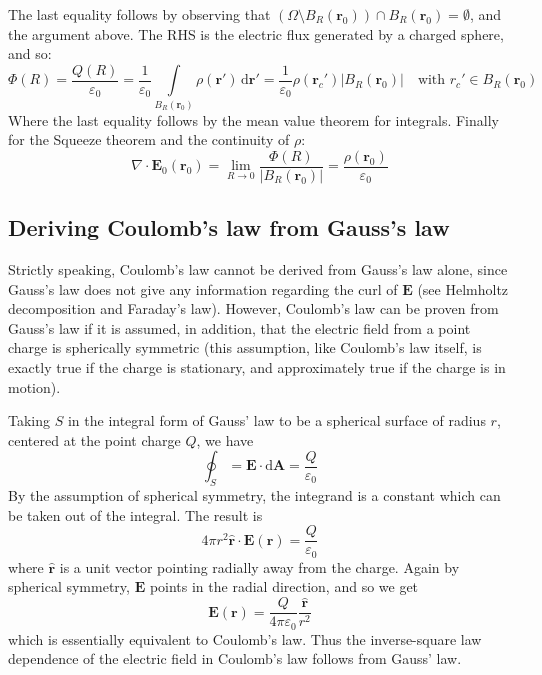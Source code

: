 \documentclass[a4paper]{article}
\begin{document}
The last equality follows by observing that \((\Omega \setminus B_R(\mathbf{r}_0)) \cap B_R(\mathbf{r}_0) = \emptyset\), and the argument above.
The RHS is the electric flux generated by a charged sphere, and so:
\[
    \Phi(R) = \frac{Q(R)}{\varepsilon_0}
    = \frac{1}{\varepsilon_0}
        \int\limits_{B_R(\mathbf{r}_0)}
            \rho(\mathbf{r}') \, \mathrm{d}\mathbf{r}'
    = \frac{1}{\varepsilon_0}
        \rho(\mathbf{r}_c') |B_R(\mathbf{r}_0)|
            \quad \text{with } r_c' \in B_R(\mathbf{r}_0)
\]
Where the last equality follows by the mean value theorem for integrals. Finally for the Squeeze theorem and the continuity of \(\rho\): 
\[
    \nabla \cdot \mathbf{E}_0(\mathbf{r}_0) =
        \lim_{R \to 0} \frac{\Phi(R)}{|B_R(\mathbf{r}_0)|}
    = \frac{\rho(\mathbf{r}_0)}{\varepsilon_0}
\]

\subsection{Deriving Coulomb's law from Gauss's law}
Strictly speaking, Coulomb's law cannot be derived from Gauss's law alone, since Gauss's law does not give any information regarding the curl of \(\mathbf{E}\) (see Helmholtz decomposition and Faraday's law). However, Coulomb's law can be proven from Gauss's law if it is assumed, in addition, that the electric field from a point charge is spherically symmetric (this assumption, like Coulomb's law itself, is exactly true if the charge is stationary, and approximately true if the charge is in motion). 

\begin{mdframed}[%
    style=mystyle,%
    frametitle={Outline of proof}]

Taking \(S\) in the integral form of Gauss' law to be a spherical surface of radius \(r\), centered at the point charge \(Q\), we have 
\[
    \oint_S = \mathbf{E} \cdot \mathrm{d}\mathbf{A} = \frac{Q}{\varepsilon_0}
\]
By the assumption of spherical symmetry, the integrand is a constant which can be taken out of the integral. The result is 
\[
    4 \pi r^2 \hat{\mathbf{r}} \cdot \mathbf{E}(\mathbf{r}) = \frac{Q}{\varepsilon_0}
\]
where \(\hat{\mathbf{r}}\) is a unit vector pointing radially away from the charge. Again by spherical symmetry, \(\mathbf{E}\) points in the radial direction, and so we get 
\[
    \mathbf{E}(\mathbf{r}) = \frac{Q}{4 \pi \varepsilon_0} \frac{\hat{\mathbf{r}}}{r^2}
\]
which is essentially equivalent to Coulomb's law. Thus the inverse-square law dependence of the electric field in Coulomb's law follows from Gauss' law. 
\end{mdframed}
\end{document}
